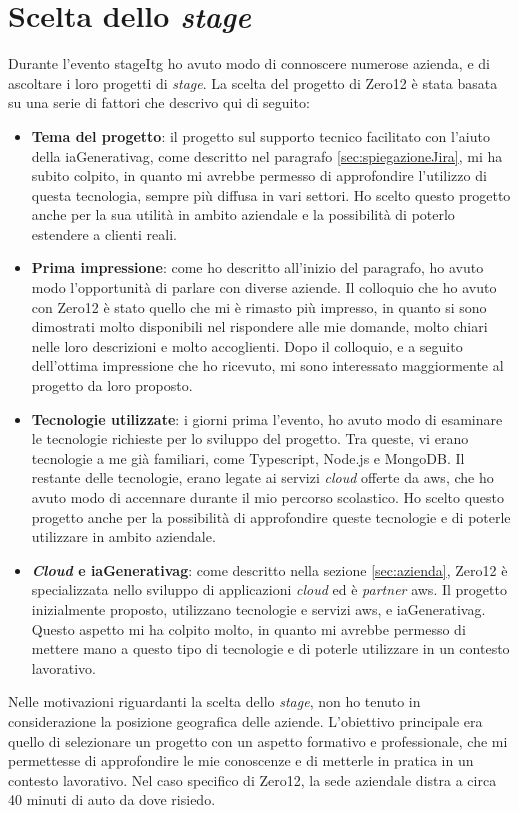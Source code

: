 \section{Scelta dello \textit{stage}} \label{sec:sceltaStage}
Durante l'evento \gls{stageItg} ho avuto modo di connoscere numerose azienda, e di ascoltare i loro progetti di \textit{stage}. 
La scelta del progetto di Zero12 è stata basata su una serie di fattori che descrivo qui di seguito:
\begin{itemize}
    \item \textbf{Tema del progetto}: il progetto sul supporto tecnico facilitato con l'aiuto della \gls{iaGenerativag}, come descritto nel paragrafo \ref{sec:spiegazioneJira}, mi ha subito colpito, in quanto mi avrebbe permesso di approfondire l'utilizzo di questa tecnologia, sempre più diffusa in vari settori. Ho scelto questo progetto anche per la sua utilità in ambito aziendale e la possibilità di poterlo estendere a clienti reali.
    \item \textbf{Prima impressione}: come ho descritto all'inizio del paragrafo, ho avuto modo l'opportunità di parlare con diverse aziende. Il colloquio che ho avuto con Zero12 è stato quello che mi è rimasto più impresso, in quanto si sono dimostrati molto disponibili nel rispondere alle mie domande, molto chiari nelle loro descrizioni e molto accoglienti. Dopo il colloquio, e a seguito dell'ottima impressione che ho ricevuto, mi sono interessato maggiormente al progetto da loro proposto.
    \item \textbf{Tecnologie utilizzate}: i giorni prima l'evento, ho avuto modo di esaminare le tecnologie richieste per lo sviluppo del progetto. Tra queste, vi erano tecnologie a me già familiari, come Typescript, Node.js e MongoDB. Il restante delle tecnologie, erano legate ai servizi \textit{cloud} offerte da \gls{aws}, che ho avuto modo di accennare durante il mio percorso scolastico. Ho scelto questo progetto anche per la possibilità di approfondire queste tecnologie e di poterle utilizzare in ambito aziendale.
    \item \textbf{\textit{Cloud} e \gls{iaGenerativag}}: come descritto nella sezione \ref{sec:azienda}, Zero12 è specializzata nello sviluppo di applicazioni \textit{cloud} ed è \textit{partner} \gls{aws}. Il progetto inizialmente proposto, utilizzano tecnologie e servizi \gls{aws}, e \gls{iaGenerativag}. Questo aspetto mi ha colpito molto, in quanto mi avrebbe permesso di mettere mano a questo tipo di tecnologie e di poterle utilizzare in un contesto lavorativo.
\end{itemize}
Nelle motivazioni riguardanti la scelta dello \textit{stage}, non ho tenuto in considerazione la posizione geografica delle aziende. L'obiettivo principale era quello di selezionare un progetto con un aspetto formativo e professionale, che mi permettesse di approfondire le mie conoscenze e di metterle in pratica in un contesto lavorativo. Nel caso specifico di Zero12, la sede aziendale distra a circa 40 minuti di auto da dove risiedo.
